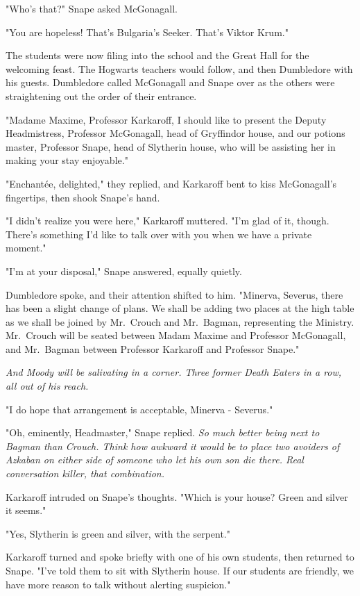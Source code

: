 "Who's that?" Snape asked McGonagall.

"You are hopeless! That's Bulgaria's Seeker. That's Viktor Krum."

The students were now filing into the school and the Great Hall for the welcoming feast. The Hogwarts teachers would follow, and then Dumbledore with his guests. Dumbledore called McGonagall and Snape over as the others were straightening out the order of their entrance.

"Madame Maxime, Professor Karkaroff, I should like to present the Deputy Headmistress, Professor McGonagall, head of Gryffindor house, and our potions master, Professor Snape, head of Slytherin house, who will be assisting her in making your stay enjoyable."

"Enchantée, delighted," they replied, and Karkaroff bent to kiss McGonagall's fingertips, then shook Snape's hand.

"I didn't realize you were here," Karkaroff muttered. "I'm glad of it, though. There's something I'd like to talk over with you when we have a private moment."

"I'm at your disposal," Snape answered, equally quietly.

Dumbledore spoke, and their attention shifted to him. "Minerva, Severus, there has been a slight change of plans. We shall be adding two places at the high table as we shall be joined by Mr.~Crouch and Mr.~Bagman, representing the Ministry. Mr.~Crouch will be seated between Madam Maxime and Professor McGonagall, and Mr.~Bagman between Professor Karkaroff and Professor Snape."

\emph{And Moody will be salivating in a corner. Three former Death Eaters in a row, all out of his reach.}

"I do hope that arrangement is acceptable, Minerva - Severus."

"Oh, eminently, Headmaster," Snape replied. \emph{So much better being next to Bagman than Crouch. Think how awkward it would be to place two avoiders of Azkaban on either side of someone who let his own son die there. Real conversation killer, that combination.}

Karkaroff intruded on Snape's thoughts. "Which is your house? Green and silver it seems."

"Yes, Slytherin is green and silver, with the serpent."

Karkaroff turned and spoke briefly with one of his own students, then returned to Snape. "I've told them to sit with Slytherin house. If our students are friendly, we have more reason to talk without alerting suspicion."

